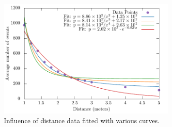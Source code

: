 \begin{figure}[H]
	\centering
	\includegraphics[width=0.80\textwidth]{./fig/semestral/inverse_square/square.pdf}
	\caption{Influence of distance data fitted with various curves.}
	\label{fig:fit1}
\end{figure}


